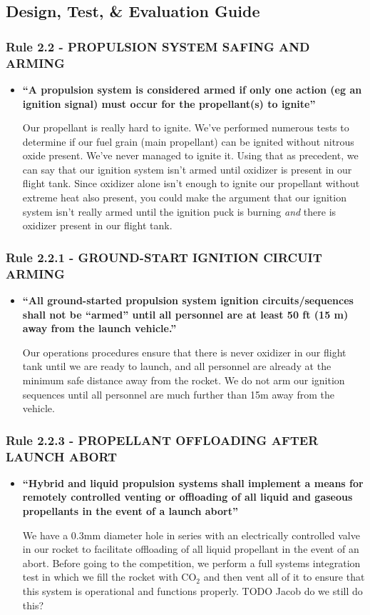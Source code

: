 \documentclass[letter]{article}
\begin{document}
\subsection{Design, Test, \& Evaluation Guide}
\subsubsection{Rule 2.2 - PROPULSION SYSTEM SAFING AND ARMING}
\begin{itemize}
\item {\bfseries ``A propulsion system is considered armed if only one action 
(eg an ignition signal) must occur for the propellant(s) to ignite''}

Our propellant is really hard to ignite. We've performed numerous tests to determine
if our fuel grain (main propellant) can be ignited without nitrous oxide present.
We've never managed to ignite it. Using that as precedent, we can say
that our ignition system isn't armed until oxidizer is present in our flight tank.
Since oxidizer alone isn't enough to ignite our propellant without extreme heat also
present, you could make the argument that our ignition system isn't really armed until
the ignition puck is burning \textit{and} there is oxidizer present in our flight tank.
\end{itemize}
\subsubsection{Rule 2.2.1 - GROUND-START IGNITION CIRCUIT ARMING}
\begin{itemize}
\item {\bfseries ``All ground-started propulsion system ignition circuits/sequences shall not be ``armed'' until all personnel are at least
50 ft (15 m) away from the launch vehicle.''}

Our operations procedures ensure that there is never oxidizer in our flight tank
until we are ready to launch, and all personnel are already at the minimum safe
distance away from the rocket. We do not arm our ignition sequences until all
personnel are much further than 15m away from the vehicle.
\end{itemize}
\subsubsection{Rule 2.2.3 - PROPELLANT OFFLOADING AFTER LAUNCH ABORT}
\begin{itemize}
\item {\bfseries ``Hybrid and liquid propulsion systems shall implement a means for remotely controlled venting or offloading of all
liquid and gaseous propellants in the event of a launch abort''}

We have a 0.3mm diameter hole in series with an electrically controlled valve in our
rocket to facilitate offloading of all liquid propellant in the event of an abort.
Before going to the competition, we perform a full systems integration test in which
we fill the rocket with CO$_2$ and then vent all of it to ensure that this system is
operational and functions properly. TODO Jacob do we still do this?
\end{itemize}
\end{document}
